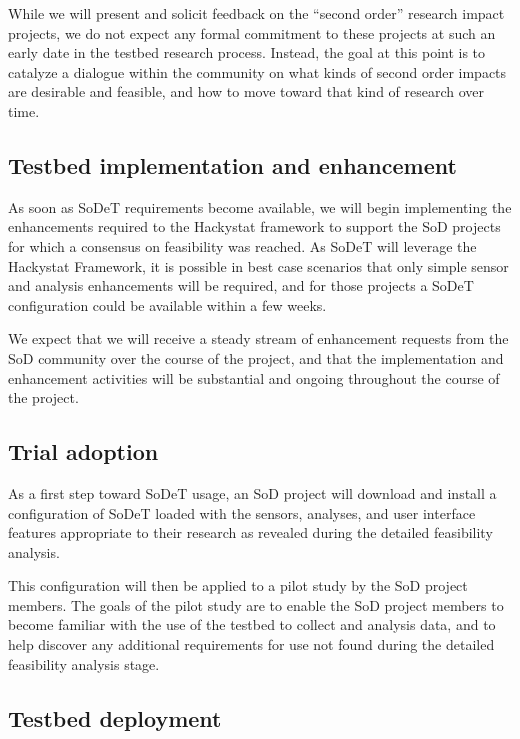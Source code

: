 While we will present and solicit feedback on the ``second order'' research
impact projects, we do not expect any formal commitment to these projects
at such an early date in the testbed research process. Instead, the goal at
this point is to catalyze a dialogue within the community on what kinds of
second order impacts are desirable and feasible, and how to move toward
that kind of research over time.

\subsection{Testbed implementation and enhancement}

As soon as SoDeT requirements become available, we will begin implementing 
the enhancements required to the Hackystat framework to support the SoD
projects for which a consensus on feasibility was reached.  As SoDeT 
will leverage the Hackystat Framework, it is possible in best case
scenarios that only simple sensor and analysis enhancements will be required,
and for those projects a SoDeT configuration could be available within 
a few weeks.  

We expect that we will receive a steady stream of enhancement requests from the
SoD community over the course of the project, and that the implementation and
enhancement activities will be substantial and ongoing throughout the course of 
the project. 

\subsection{Trial adoption}

As a first step toward SoDeT usage, an SoD project will download and
install a configuration of SoDeT loaded with the sensors,
analyses, and user interface features appropriate to their research as
revealed during the detailed feasibility analysis.

This configuration will then be applied to a pilot study by the SoD project
members.  The goals of the pilot study are to enable the SoD project members to 
become familiar with the use of the testbed to collect and analysis data, and 
to help discover any additional requirements for use not found during the 
detailed feasibility analysis stage.  

\subsection{Testbed deployment}

